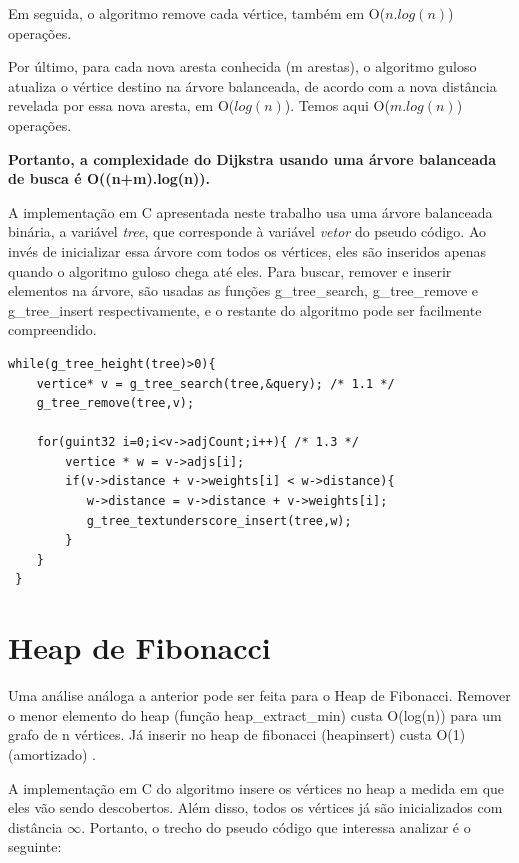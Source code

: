 \documentclass[
	12pt,				%
	oneside,			%
	a4paper,			%
	english,			%
	french,				%
	spanish,			%
	brazil,				%
	]{abntex2}
\begin{document}
Em seguida, o algoritmo remove cada vértice, também em \textsf{O($n.log(n)$)} operações.

Por último, para cada nova aresta conhecida (m arestas), o algoritmo guloso atualiza o vértice destino na árvore balanceada, de acordo com a nova distância revelada por essa nova aresta, em \textsf{O($log(n)$)}. Temos aqui \textsf{O($m.log(n)$)} operações.

\textbf{Portanto, a complexidade do Dijkstra usando uma árvore balanceada de busca é O((n+m).log(n)).}

A implementação em C apresentada neste trabalho usa uma árvore balanceada binária, a variável \emph{tree}, que corresponde à variável \emph{vetor} do pseudo código. Ao invés de inicializar essa árvore com todos os vértices, eles são inseridos apenas quando o algoritmo guloso chega até eles. Para buscar, remover e inserir elementos na árvore, são usadas as funções g\_tree\_search, g\_tree\_remove e g\_tree\_insert respectivamente, e o restante do algoritmo pode ser facilmente compreendido.

\begin{lstlisting}[caption=Corpo do algoritmo Dijkstra com uso da árvore balanceada de busca, label=dijkstra.arvore]
 while(g_tree_height(tree)>0){  
    vertice* v = g_tree_search(tree,&query); /* 1.1 */
    g_tree_remove(tree,v);  

    for(guint32 i=0;i<v->adjCount;i++){ /* 1.3 */
        vertice * w = v->adjs[i];
        if(v->distance + v->weights[i] < w->distance){
           w->distance = v->distance + v->weights[i];
           g_tree_textunderscore_insert(tree,w);
        } 
    }
 }    
\end{lstlisting}

\section{Heap de Fibonacci}

Uma análise análoga a anterior pode ser feita para o Heap de Fibonacci. Remover o menor elemento do heap (função heap\_extract\_min) custa O(log(n)) para um grafo de n vértices. Já inserir no heap de fibonacci (heap\textunderscore insert) custa O(1) (amortizado) \cite{dasgupta2006}.

A implementação em C do algoritmo insere os vértices no heap a medida em que eles vão sendo descobertos. Além disso, todos os vértices já são inicializados com distância $\infty$. Portanto, o trecho do pseudo código que interessa analizar é o seguinte:
\end{document}
